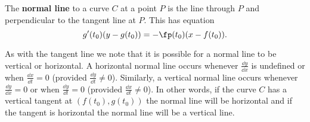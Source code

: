 \begin{definition}\label{def:normal_par}
The \textbf{normal line} to a curve $C$ at a point $P$ is the line through $P$ and perpendicular to the tangent line at $P$. This has equation
\[g'(t_0)(y-g(t_0))=-\fp(t_0)(x-f(t_0)).\]
\end{definition}

As with the tangent line we note that it is possible for a normal line to be vertical or horizontal. A horizontal normal line occurs whenever $\frac{\dd y}{\dd x}$ is undefined or when $\frac{\dd x}{\dd t} = 0$ (provided $\frac{\dd y}{\dd t} \neq 0$). Similarly, a vertical normal line occurs whenever $\frac{\dd y}{\dd x} = 0$ or when $\frac{\dd y}{\dd t} = 0$ (provided $\frac{\dd x}{\dd t} \neq 0$). In other words, if the curve $C$ has a vertical tangent  at $(f(t_0), g(t_0))$ the normal line will be horizontal and if the tangent is horizontal the normal line will be a vertical line.


